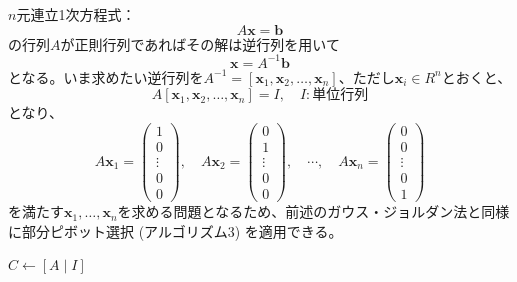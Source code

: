 \documentclass[12pt,a4paper]{ltjsreport}
\begin{document}
$n$元連立1次方程式：
\begin{equation}
A\boldsymbol{x} = \boldsymbol{b}
\end{equation}
の行列$A$が正則行列であればその解は逆行列を用いて
\begin{equation}
\boldsymbol{x} = A^{-1}\boldsymbol{b}
\end{equation}
となる。いま求めたい逆行列を$A^{-1} = [\boldsymbol{x}_1, \boldsymbol{x}_2, \ldots, \boldsymbol{x}_n]$、ただし$\boldsymbol{x}_i \in R^n$とおくと、
\begin{equation}
A[\boldsymbol{x}_1, \boldsymbol{x}_2, \ldots, \boldsymbol{x}_n] = I, \quad I: \text{単位行列}
\end{equation}
となり、
\begin{equation}
A\boldsymbol{x}_1 = \begin{pmatrix} 1 \\ 0 \\ \vdots \\ 0 \\ 0 \end{pmatrix}, \quad
A\boldsymbol{x}_2 = \begin{pmatrix} 0 \\ 1 \\ \vdots \\ 0 \\ 0 \end{pmatrix}, \quad \cdots, \quad
A\boldsymbol{x}_n = \begin{pmatrix} 0 \\ 0 \\ \vdots \\ 0 \\ 1 \end{pmatrix}
\end{equation}
を満たす$\boldsymbol{x}_1, \ldots, \boldsymbol{x}_n$を求める問題となるため、前述のガウス・ジョルダン法と同様に部分ピボット選択 (アルゴリズム3) を適用できる。

\begin{algorithm}[H]
\caption{逆行列による解法}
\BlankLine
$C \leftarrow [A \mid I]$\;
\end{algorithm}
\end{document}
